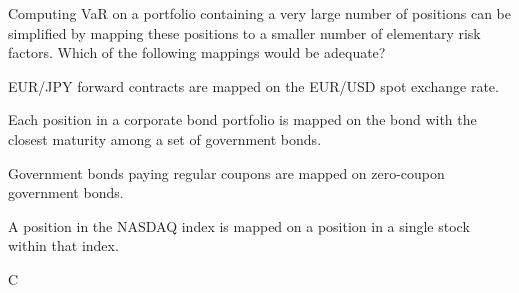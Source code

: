 \documentclass{article}
\newcounter{question} %
\begin{document}
\begin{question}
    Computing VaR on a portfolio containing a very large number of positions can be simplified by mapping these positions to a smaller number of elementary risk factors. Which of the following mappings would be adequate?
\end{question}

\begin{choices}
    \item EUR/JPY forward contracts are mapped on the EUR/USD spot exchange rate.
    \item Each position in a corporate bond portfolio is mapped on the bond with the closest maturity among a set of government bonds.
    \item Government bonds paying regular coupons are mapped on zero-coupon government bonds.
    \item A position in the NASDAQ index is mapped on a position in a single stock within that index.
\end{choices}

\begin{correctanswer}
    C
\end{correctanswer}
\end{document}
